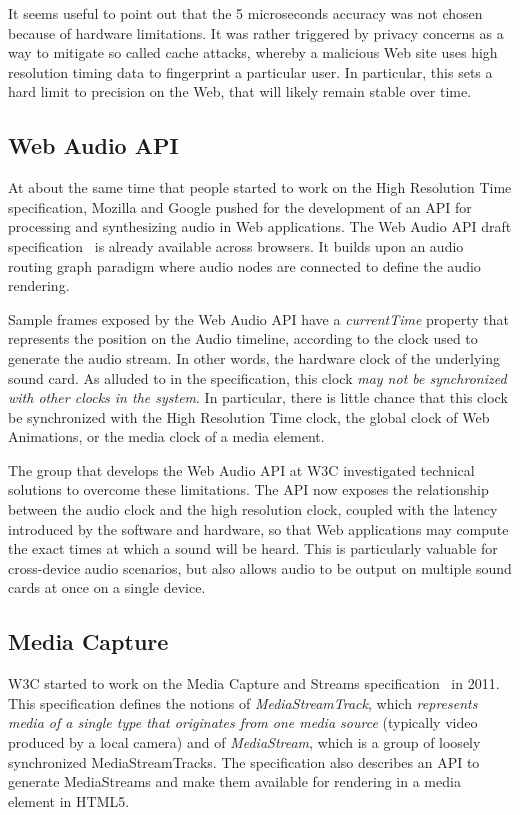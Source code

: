 It seems useful to point out that the 5 microseconds accuracy was not chosen
because of hardware limitations. It was rather triggered by privacy concerns
as a way to mitigate so called cache attacks, whereby a malicious Web site
uses high resolution timing data to fingerprint a particular user. In
particular, this sets a hard limit to precision on the Web, that will likely
remain stable over time.


\subsection{Web Audio API}
\label{sec:webaudio}

At about the same time that people started to work on the High Resolution Time
specification, Mozilla and Google pushed for the development of an API for
processing and synthesizing audio in Web applications. The Web Audio API draft
specification~\cite{webaudio} is already available across browsers. It builds upon an
audio routing graph paradigm where audio nodes are connected to define the
audio rendering.

Sample frames exposed by the Web Audio API have a \emph{currentTime} property that
represents the position on the Audio timeline, according to the clock used to
generate the audio stream. In other words, the hardware clock of the underlying
sound card. As alluded to in the specification, this clock \emph{may not be
synchronized with other clocks in the system}. In particular, there is little
chance that this clock be synchronized with the High Resolution Time clock,
the global clock of Web Animations, or the media clock of a media element.

The group that develops the Web Audio API at W3C investigated technical
solutions to overcome these limitations. The API now exposes the relationship
between the audio clock and the high resolution clock, coupled with the
latency introduced by the software and hardware, so that Web applications may
compute the exact times at which a sound will be heard. This is particularly
valuable for cross-device audio scenarios, but also allows audio to
be output on multiple sound cards at once on a single device.




\subsection{Media Capture}
\label{sec:capture}

W3C started to work on the Media Capture and Streams
specification~\cite{capture} in 2011. This specification defines the notions
of \emph{MediaStreamTrack}, which \emph{represents media of a single type that
originates from one media source} (typically video produced by a local camera)
and of \emph{MediaStream}, which is a group of loosely synchronized
MediaStreamTracks. The specification also describes an API to generate
MediaStreams and make them available for rendering in a media element in
HTML5.

